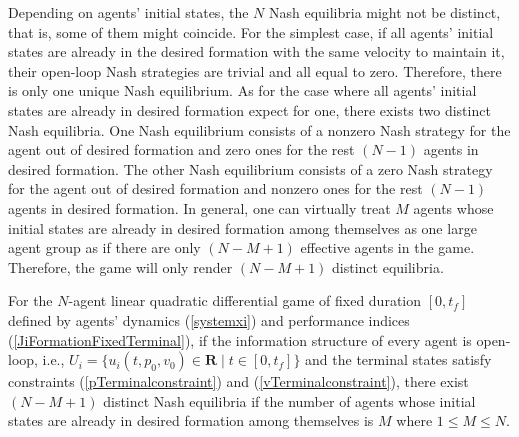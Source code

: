 \documentclass[12pt,draftcls,onecolumn]{IEEEtran}  %
\begin{document}
{Depending on agents' initial states, the $N$ Nash equilibria might not be distinct, that is, some of them might coincide. For the simplest case, if all agents' initial states are already in the desired formation with the same velocity to maintain it, their open-loop Nash strategies are trivial and all equal to zero. Therefore, there is only one unique Nash equilibrium. As for the case where all agents' initial states are already in desired formation expect for one, there exists two distinct Nash equilibria. One Nash equilibrium consists of a nonzero Nash strategy for the agent out of desired formation and zero ones for the rest $(N-1)$ agents in desired formation. The other Nash equilibrium consists of a zero Nash strategy for the agent out of desired formation and nonzero ones for the rest $(N-1)$ agents in desired formation. In general, one can virtually treat $M$ agents whose initial states are already in desired formation among themselves as one large agent group as if there are only $(N-M+1)$ effective agents in the game. Therefore, the game will only render $(N-M+1)$ distinct equilibria.
\begin{Cor}
For the $N$-agent linear quadratic differential game of fixed duration $[0,t_f]$ defined by agents' dynamics (\ref{systemxi}) and performance indices (\ref{JiFormationFixedTerminal}), if the information structure of every agent is open-loop, i.e., $U_i=\{u_i(t,p_0,v_0)\in \mathbf{R} \mid t\in[0,t_f]\}$ and the terminal states satisfy constraints (\ref{pTerminalconstraint}) and (\ref{vTerminalconstraint}), there exist $(N-M+1)$ distinct Nash equilibria if the number of agents whose initial states are already in desired formation among themselves is $M$ where $1\leq M\leq N$.
\end{Cor}

}
\end{document}
